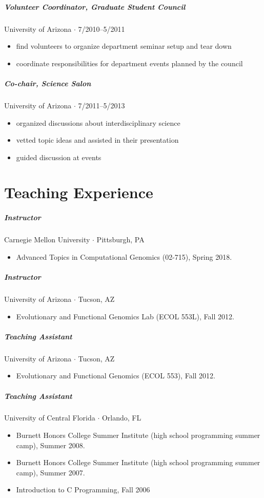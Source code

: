 \documentclass[10pt,letterpaper]{article}
\begin{document}
\subparagraph{Volunteer Coordinator, Graduate Student Council}
University of Arizona $\cdot$ 7/2010--5/2011
\begin{itemize}
    \item find volunteers to organize department seminar setup and tear down
    \item coordinate responsibilities for department events planned by the council
\end{itemize}

\subparagraph{Co-chair, Science Salon}
University of Arizona $\cdot$ 7/2011--5/2013
\begin{itemize}
    \item organized discussions about interdisciplinary science
    \item vetted topic ideas and assisted in their presentation
    \item guided discussion at events
\end{itemize}




\section*{Teaching Experience}

\subparagraph{Instructor}  Carnegie Mellon University $\cdot$ Pittsburgh, PA
\begin{itemize}
    \item Advanced Topics in Computational Genomics (02-715), Spring 2018.
\end{itemize}

\subparagraph{Instructor} University of Arizona $\cdot$ Tucson, AZ
\begin{itemize}
    \item Evolutionary and Functional Genomics Lab (ECOL 553L), Fall 2012.
\end{itemize}

\subparagraph{Teaching Assistant}
University of Arizona $\cdot$ Tucson, AZ
\begin{itemize}
    \item Evolutionary and Functional Genomics (ECOL 553), Fall 2012.
\end{itemize}

\subparagraph{Teaching Assistant}
University of Central Florida $\cdot$ Orlando, FL
\begin{itemize}
    \item Burnett Honors College Summer Institute (high school programming summer camp), Summer 2008.
    \item Burnett Honors College Summer Institute (high school programming summer camp), Summer 2007.
    \item Introduction to C Programming, Fall 2006
\end{itemize}
\end{document}
